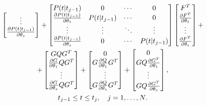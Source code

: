 \documentclass[a4paper,14pt]{extarticle}
\begin{document}
\begin{multline}
\begin{bmatrix}
		\vdots \\
		\frac{\partial P(t|t_{j-1})}{\partial \theta_s}
	\end{bmatrix} +
	\begin{bmatrix}
	P(t|t_{j-1}) & 0 & \cdots & 0 \\
	\frac{\partial P(t|t_{j-1})}{\partial \theta_1} & P(t|t_{j-1}) & \cdots & 0 \\
	\vdots & \vdots & \ddots & \vdots \\
	\frac{\partial P(t|t_{j-1})}{\partial \theta_s} & 0 & \cdots & P(t|t_{j-1})
	\end{bmatrix}
	\begin{bmatrix}
		F^T \\
		\frac{\partial F^T}{\partial \theta_1} \\
		\vdots \\
		\frac{\partial F^T}{\partial \theta_s}
	\end{bmatrix} + \\
	+ \begin{bmatrix}
		G Q G^T\\
		\frac{\partial G}{\partial \theta_1} Q G^T \\
		\vdots \\
		\frac{\partial G}{\partial \theta_s} Q G^T
	\end{bmatrix} +
	\begin{bmatrix}
		0 \\
		G \frac{\partial Q}{\partial \theta_1} G^T \\
		\vdots \\
		G \frac{\partial Q}{\partial \theta_s} G^T
	\end{bmatrix} +
	\begin{bmatrix}
		0 \\
		G Q \frac{\partial G^T}{\partial \theta_1} \\
		\vdots \\
		G Q \frac{\partial G^T}{\partial \theta_s}
	\end{bmatrix},\\ \hspace{\fill} t_{j-1} \le t \le t_j, \quad j = 1, \ldots, N. \hspace{\fill}
\end{multline}
\end{document}
